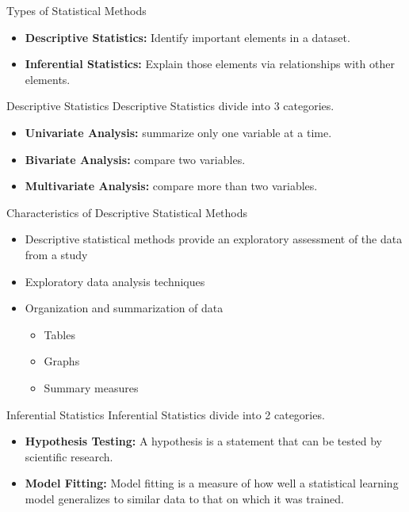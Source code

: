 \begin{frame}[t]{Types of Statistical Methods}
	\begin{itemize}
		\item \textbf{Descriptive Statistics:} Identify important elements in a
		dataset.
		\item \textbf{Inferential Statistics:} Explain those elements via
		relationships with other elements.
	\end{itemize}
\end{frame}

\begin{frame}[t]{Descriptive Statistics}
	Descriptive Statistics divide into 3 categories.
	\begin{itemize}
		\item \textbf{Univariate Analysis:}  summarize only one variable at a 
		time.
		\item \textbf{Bivariate Analysis:}  compare two variables.
		\item \textbf{Multivariate Analysis:}  compare more than two variables.
	\end{itemize}
\end{frame}

\begin{frame}[t]{Characteristics of Descriptive Statistical Methods}
	\begin{itemize}
		\item Descriptive statistical methods provide an exploratory
		assessment of the data from a study
		\item Exploratory data analysis techniques
		\item Organization and summarization of data
		\begin{itemize}
			\item Tables
			\item Graphs
			\item Summary measures
		\end{itemize}
	\end{itemize}
\end{frame}


\begin{frame}[t]{Inferential Statistics}
	Inferential Statistics divide into 2 categories.
	\begin{itemize}
		\item \textbf{Hypothesis
			Testing:} A hypothesis is a statement that can be tested by 
		scientific research.
		\item \textbf{Model Fitting:} Model fitting is a measure of how well a 
		statistical learning model generalizes to similar data to that on which 
		it was trained.
	\end{itemize}
\end{frame}


